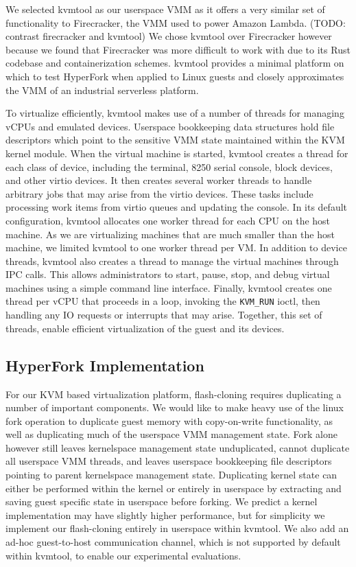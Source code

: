 We selected kvmtool as our userspace VMM as it offers a very similar set of
functionality to Firecracker, the VMM used to power Amazon Lambda. (TODO:
contrast firecracker and kvmtool) We chose kvmtool over Firecracker however
because we found that Firecracker was more difficult to work with due to its
Rust codebase and containerization schemes. kvmtool provides a minimal
platform on which to test HyperFork when applied to Linux guests and closely
approximates the VMM of an industrial serverless platform.

To virtualize efficiently, kvmtool makes use of a number of threads for
managing vCPUs and emulated devices. Userspace bookkeeping data structures hold
file descriptors which point to the sensitive VMM state maintained within the
KVM kernel module. When the virtual machine is started, kvmtool creates a
thread for each class of device, including the terminal, 8250 serial console,
block devices, and other virtio devices. It then creates several worker threads
to handle arbitrary jobs that may arise from the virtio devices. These tasks
include processing work items from virtio queues and updating the console. In
its default configuration, kvmtool allocates one worker thread for each CPU on
the host machine. As we are virtualizing machines that are much smaller than
the host machine, we limited kvmtool to one worker thread per VM. In addition
to device threads, kvmtool also creates a thread to manage the virtual machines
through IPC calls. This allows administrators to start, pause, stop, and debug
virtual machines using a simple command line interface. Finally, kvmtool
creates one thread per vCPU that proceeds in a loop, invoking the
\texttt{KVM\_RUN} ioctl, then handling any IO requests or interrupts that may
arise. Together, this set of threads, enable efficient virtualization of the
guest and its devices.

\subsection{HyperFork Implementation}

For our KVM based virtualization platform, flash-cloning requires duplicating a
number of important components. We would like to make heavy use of the linux
fork operation to duplicate guest memory with copy-on-write functionality, as
well as duplicating much of the userspace VMM management state. Fork alone
however still leaves kernelspace management state unduplicated, cannot
duplicate all userspace VMM threads, and leaves userspace bookkeeping file
descriptors pointing to parent kernelspace management state. Duplicating kernel
state can either be performed within the kernel or entirely in userspace by
extracting and saving guest specific state in userspace before forking. We
predict a kernel implementation may have slightly higher performance, but for
simplicity we implement our flash-cloning entirely in userspace within kvmtool.
We also add an ad-hoc guest-to-host communication channel, which is not
supported by default within kvmtool, to enable our experimental evaluations.

